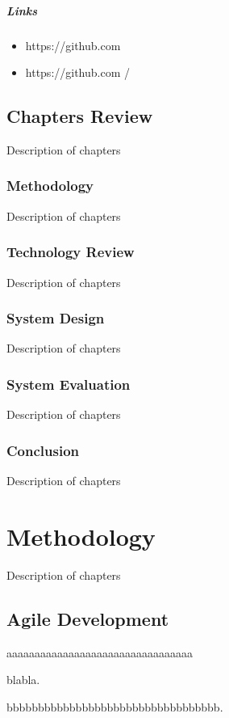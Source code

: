 \paragraph{Links}
\begin{itemize}
\item https://github.com
\item https://github.com
/
\end{itemize}

\section{Chapters Review}
Description of chapters

\subsection{Methodology}
Description of chapters

\subsection{Technology Review}
Description of chapters

\subsection{System Design}
Description of chapters

\subsection{System Evaluation}
Description of chapters

\subsection{Conclusion}
Description of chapters

\chapter{Methodology}
Description of chapters

\section{Agile Development}
aaaaaaaaaaaaaaaaaaaaaaaaaaaaaaaaa\par
blabla\cite{FirstnameLastname}.\par
bbbbbbbbbbbbbbbbbbbbbbbbbbbbbbbbbb\cite{NameOfreff}.


